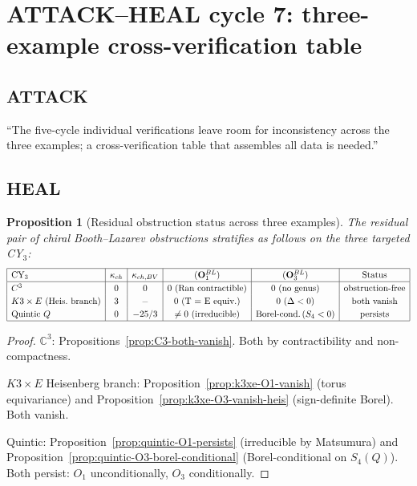 \documentclass[11pt]{amsart}
\newtheorem{proposition}[theorem]{Proposition}
\newcommand{\kch}{\kappa_{\mathrm{ch}}}
\newcommand{\kchBV}{\kappa_{\mathrm{ch},\mathrm{BV}}}
\newcommand{\bC}{\mathbb{C}}
\begin{document}
\section{ATTACK--HEAL cycle 7: three-example cross-verification
table}
\label{sec:cycle-7-verification-table}

\subsection*{ATTACK}

``The five-cycle individual verifications leave room for inconsistency
across the three examples; a cross-verification table that assembles
all data is needed.''

\subsection*{HEAL}

\begin{proposition}[Residual obstruction status across three
examples]
\label{prop:verification-table}
The residual pair of chiral Booth--Lazarev obstructions stratifies
as follows on the three targeted CY$_3$:
\[
\renewcommand{\arraystretch}{1.2}
\begin{array}{|l|c|c|c|c|c|}
\hline
\text{CY}_3 & \kch & \kchBV & (\mathbf{O}_1^{\mathrm{BL}}) &
(\mathbf{O}_3^{\mathrm{BL}}) & \text{Status} \\
\hline
\bC^3 & 0 & 0 & 0 \text{ (Ran contractible)} & 0 \text{ (no genus)} &
\text{obstruction-free} \\
K3 \times E \text{ (Heis.\ branch)} & 3 & - & 0 \text{ (T = E equiv.)}
& 0 \text{ (} \Delta < 0 \text{)} & \text{both vanish} \\
\text{Quintic } Q & 0 & -25/3 & \neq 0 \text{ (irreducible)} &
\text{Borel-cond.}\,(S_4 < 0) & \text{persists} \\
\hline
\end{array}
\]
\end{proposition}

\begin{proof}
$\bC^3$: Propositions~\ref{prop:C3-both-vanish}. Both by
contractibility and non-compactness.

$K3 \times E$ Heisenberg branch: Proposition~\ref{prop:k3xe-O1-vanish}
(torus equivariance) and Proposition~\ref{prop:k3xe-O3-vanish-heis}
(sign-definite Borel). Both vanish.

Quintic: Proposition~\ref{prop:quintic-O1-persists} (irreducible by
Matsumura) and Proposition~\ref{prop:quintic-O3-borel-conditional}
(Borel-conditional on $S_4(Q)$). Both persist: $O_1$
unconditionally, $O_3$ conditionally.
\end{proof}
\end{document}
